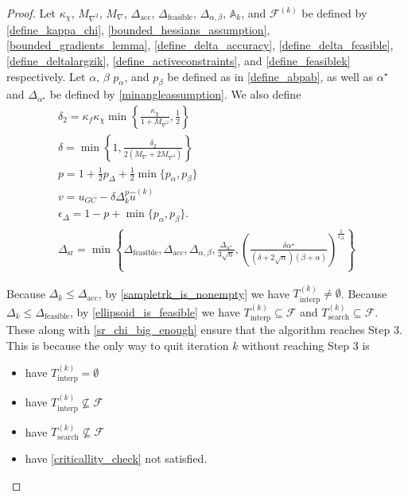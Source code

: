 \documentclass{article}
\theoremstyle{case}
\numberwithin{theorem}{subsection}
\newcommand{\activeconstraintsk}{{\mathbb A_{k}}}
\newcommand{\dacc}{{\Delta_{\textrm{acc}}}}
\newcommand{\deltalargzik}{{\Delta_{\alpha,\beta}}}
\newcommand{\dfeas}{{\Delta_{\textrm{feasible}}}}
\newcommand{\dk}{\Delta_k}
\newcommand{\dsr}{{\Delta_{\textrm{sr}}}}
\newcommand{\feasiblek}{{\mathcal F^{(k)}}}
\newcommand{\feasible}{{\mathcal F}}
\newcommand{\huk}{{{\hat u}^{(k)}}}
\newcommand{\maxgrad}{{M_{\nabla}}}
\newcommand{\maxhessian}{{M_{\nabla^2}}}
\newcommand{\minanglealpha}{{ \alpha^{\star} }}
\newcommand{\minangledelta}{{\Delta_{\alpha^{\star}}}}
\newcommand{\sampletrk}{{T_{\text{interp}}^{(k)}}}
\newcommand{\searchtrk}{{T_{\text{search}}^{(k)}}}
\begin{document}
\begin{proof}

Let
$\kappa_{\chi}$,
$\maxhessian$,
$\maxgrad$,
$\dacc$,
$\dfeas$,
$\deltalargzik$,
$\activeconstraintsk$,
and $\feasiblek$
be defined by
\cref{define_kappa_chi},
\cref{bounded_hessians_assumption},
\cref{bounded_gradients_lemma},
\cref{define_delta_accuracy},
\cref{define_delta_feasible},
\cref{define_deltalargzik},
\cref{define_activeconstraints},
and \cref{define_feasiblek}
respectively.
Let $\alpha$, $\beta$ $p_{\alpha}$, and $p_{\beta}$
be defined as in \cref{define_abpab}, as well as $\minanglealpha$ and $\minangledelta$ be defined by \cref{minangleassumption}.
We also define
\begin{align}
\delta_2 = \kappa_f \kappa_{\chi} \min\left\{ \frac{\kappa_{\chi}}{1 + \maxhessian}, \frac 1 2 \right\} \label{define_delta2} \\
\delta = \min\left\{1, \frac{\delta_2}{2\left(\maxgrad + 2\maxhessian\right)}\right\} \label{sr_define_delta} \\
p = 1 + \frac 1 2 p_{\Delta} + \frac 1 2\min\{p_{\alpha}, p_{\beta}\} \label{sr_def_p}\\
v = u_{GC} - \delta \dk^{p} \huk \label{define_v} \\
\epsilon_{\Delta} = 1-p+\min\{p_{\alpha}, p_{\beta}\}. \label{sr_def_epsilon_delta} \\
\dsr = \min\left\{
\dfeas,
\dacc,
\deltalargzik,
\frac{\minangledelta}{3\sqrt{n}},
\left(\frac{\delta \minanglealpha}{\left(\delta + 2\sqrt{n}\right)\left(\beta +\alpha\right)}\right)^{\frac 1 {\epsilon_{\Delta}}}
\right\} \label{define_delta_sufficient_reduction}
\end{align}

\color{red}
Because $\dk \le \dacc$, by \cref{sampletrk_is_nonempty} we have $\sampletrk \ne \emptyset$.
Because $\dk \le \dfeas$, by \cref{ellipsoid_is_feasible} we have $\sampletrk \subseteq \feasible$ and $\searchtrk \subseteq \feasible$.
These along with \cref{sr_chi_big_enough} ensure that the algorithm reaches Step 3.
This is because the only way to quit iteration $k$ without reaching Step 3 is
\begin{itemize}
\item have $\sampletrk = \emptyset$
\item have $\sampletrk \not \subseteq \feasible$
\item have $\searchtrk \not \subseteq \feasible$
\item have \cref{criticallity_check} not satisfied.
\end{itemize}
\color{black}


\end{proof}
\end{document}
